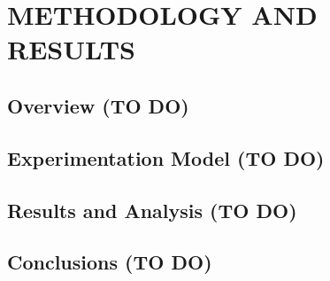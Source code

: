 \chapter{METHODOLOGY AND RESULTS}
\label{ch:methodology-results}



\section{Overview (TO DO)}


\section{Experimentation Model (TO DO)}
\label{sec:experiment-methodology}


\section{Results and Analysis (TO DO)}


\section{Conclusions (TO DO)}



